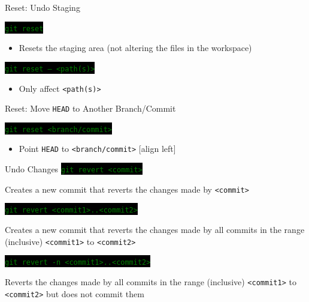 \documentclass[
14pt,
aspectratio=169,
usenames,
dvipsnames,
x11names]{beamer}
\newcommand{\code}[1]{{\small\colorbox{black}{\textcolor{green}{\texttt{#1}}}}}
\begin{document}
\begin{frame}{Reset: Undo Staging}

  \code{git reset}
  \begin{itemize}
  \item Resets the staging area (not altering the files in the workspace)
  \end{itemize}

  \vfill
  \pause

  \code{git reset -- <path(s)>}
  \begin{itemize}
  \item Only affect \texttt{<path(s)>}
  \end{itemize}
\end{frame}

\begin{frame}{Reset: Move \texttt{HEAD} to Another Branch/Commit}

  \code{git reset <branch/commit>}
  \begin{itemize}
  \item Point \texttt{HEAD} to \texttt{<branch/commit>}
    [align left]
  \end{itemize}
\end{frame}

\begin{frame}{Undo Changes}
  \code{git revert <commit>}

  Creates a new commit that reverts the changes made by \texttt{<commit>}

  \vfill
  \pause

  \code{git revert <commit1>..<commit2>}

  Creates a new commit that reverts the changes made by all commits in the range (inclusive) \texttt{<commit1>} to \texttt{<commit2>}

  \vfill
  \pause

  \code{git revert -n <commit1>..<commit2>}

  Reverts the changes made by all commits in the range (inclusive) \texttt{<commit1>} to \texttt{<commit2>} but does not commit them
\end{frame}
\end{document}
